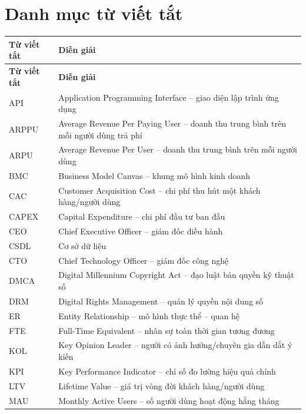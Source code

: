 \section*{Danh mục từ viết tắt}
{}
\thispagestyle{fancy}

\renewcommand{\arraystretch}{1.25}
\begin{longtable}{|L{3cm}|L{11cm}|}
\hline
\textbf{Từ viết tắt} & \textbf{Diễn giải} \\
\hline
\endfirsthead

\hline
\textbf{Từ viết tắt} & \textbf{Diễn giải} \\
\hline
\endhead

API & Application Programming Interface -- giao diện lập trình ứng dụng \\
\hline
ARPPU & Average Revenue Per Paying User -- doanh thu trung bình trên mỗi người dùng trả phí \\
\hline
ARPU & Average Revenue Per User -- doanh thu trung bình trên mỗi người dùng \\
\hline
BMC & Business Model Canvas -- khung mô hình kinh doanh \\
\hline
CAC & Customer Acquisition Cost -- chi phí thu hút một khách hàng/người dùng \\
\hline
CAPEX & Capital Expenditure -- chi phí đầu tư ban đầu \\
\hline
CEO & Chief Executive Officer -- giám đốc điều hành \\
\hline
CSDL & Cơ sở dữ liệu \\
\hline
CTO & Chief Technology Officer -- giám đốc công nghệ \\
\hline
DMCA & Digital Millennium Copyright Act -- đạo luật bản quyền kỹ thuật số \\
\hline
DRM & Digital Rights Management -- quản lý quyền nội dung số \\
\hline
ER & Entity Relationship -- mô hình thực thể -- quan hệ \\
\hline
FTE & Full-Time Equivalent -- nhân sự toàn thời gian tương đương \\
\hline
KOL & Key Opinion Leader -- người có ảnh hưởng/chuyên gia dẫn dắt ý kiến \\
\hline
KPI & Key Performance Indicator -- chỉ số đo lường hiệu quả chính \\
\hline
LTV & Lifetime Value -- giá trị vòng đời khách hàng/người dùng \\
\hline
MAU & Monthly Active Users -- số người dùng hoạt động hằng tháng \\

\end{longtable}
